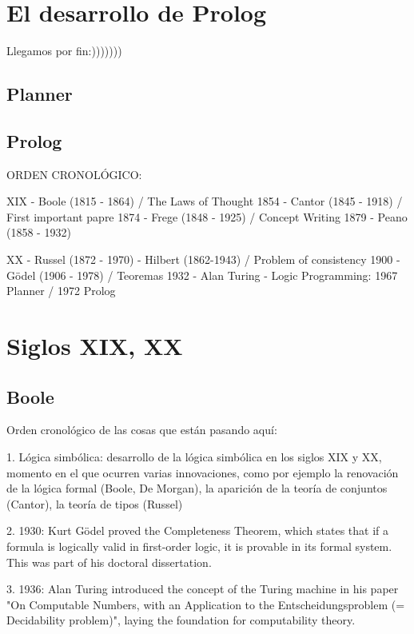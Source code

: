 \documentclass{article}
\begin{document}
\section{El desarrollo de Prolog}


Llegamos por fin:)))))))



\subsection{Planner}

\subsection{Prolog}




ORDEN CRONOLÓGICO:

XIX 
- Boole (1815 - 1864) / The Laws of Thought 1854
- Cantor (1845 - 1918) / First important papre 1874
- Frege (1848 - 1925) / Concept Writing 1879
- Peano (1858 - 1932)



XX
- Russel (1872 - 1970)
- Hilbert (1862-1943) / Problem of consistency 1900
- Gödel (1906 - 1978) / Teoremas 1932
- Alan Turing
- Logic Programming: 1967 Planner / 1972 Prolog

\section{Siglos XIX, XX}

\subsection{Boole}

Orden cronológico de las cosas que están pasando aquí:

1. Lógica simbólica: desarrollo de la
lógica simbólica en los siglos XIX y XX, momento en el que ocurren varias
innovaciones, como por ejemplo la renovación de la lógica formal (Boole, De
Morgan), la aparición de la teoría de conjuntos (Cantor), la teoría de tipos
(Russel)

2. 1930: Kurt Gödel proved the Completeness Theorem, which states that if a formula is logically valid in first-order logic, it is provable in its formal system. This was part of his doctoral dissertation.

3. 1936: Alan Turing introduced the concept of the Turing machine in his paper "On Computable Numbers, with an Application to the Entscheidungsproblem (= Decidability problem)", laying the foundation for computability theory.
\end{document}
